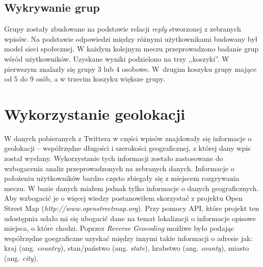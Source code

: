 \subsection{Wykrywanie grup}
\label{subsection:wykrywaniegrup}
Grupy zostały zbudowane na podstawie relacji \textit{reply}
stworzonej z zebranych wpisów. Na podstawie odpowiedzi między różnymi
użytkownikami budowany był model sieci społecznej.
W każdym kolejnym meczu przeprowadzono badanie grup wśród użytkowników.
Uzyskane wyniki podzielono na trzy ,,koszyki''. W pierwszym znalazły się grupy 
3 lub 4 osobowe. W~drugim koszyku grupy mające od 5 do 9 osób, a w trzecim koszyku
większe grupy. 


\section{Wykorzystanie geolokacji}
\label{section:wykorzystaniegeolokacji}
W danych pobieranych z Twittera w części wpisów znajdowały się informacje o 
geolokacji -- współrzędne długości i szerokości geograficznej, z której
dany wpis został wysłany. Wykorzystanie tych informacji zostało zastosowane
do wzbogacenia analiz przeprowadzonych na zebranych danych. Informacje
o położeniu użytkowników bardzo często zbiegały się z miejscem rozgrywania meczu.
W bazie danych miałem jednak tylko informacje o danych geograficznych.
Aby wzbogacić je o więcej wiedzy postanowiłem skorzystać z projektu
Open Street Map (\textit{http://www.openstreetmap.org}).
Przy pomocy API, które projekt ten udostępnia udało mi się ubogacić dane
na temat lokalizacji o informacje opisowe miejsca, o które chodzi.
Poprzez \textit{Reverse Geocoding} możliwe było podając współrzędne
goegraficzne uzyskać między innymi takie informacji o adresie jak:
kraj (ang. \textit{country}), stan/państwo (ang. \textit{state}), 
hrabstwo (ang. \textit{county}), miasto (ang. \textit{city}).

